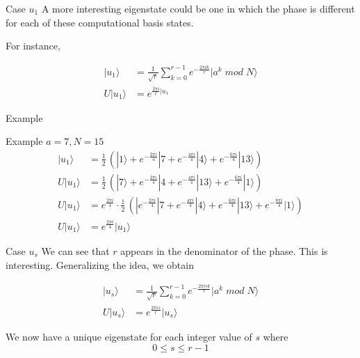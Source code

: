 \documentclass{beamer}
\begin{document}
    \begin{frame}{Case $u_1$}
        A more interesting eigenstate could be one in which the phase is different for each of these computational basis states.

        For instance,
        
        \begin{align*}
            |u_1\rangle &= \frac{1}{\sqrt{r}} \sum_{k=0}^{r-1} e^{-\frac{2 \pi i k}{r}} | a^k \; mod \; N \rangle \\
            U|u_1\rangle &= e^{\frac{2 \pi i}{r} | u_1}
        \end{align*}
    \end{frame}

    \begin{frame}{Example}
        \begin{exampleblock}{Example $a = 7, N=15$}
            \begin{align*}
                |u_1\rangle &= \frac{1}{2} \, (|1\rangle + e^{-\frac{2 \pi i}{4}}|7 + e^{-\frac{4 \pi i}{4}}|4\rangle + e^{-\frac{6 \pi i}{4}}|13\rangle) \\
                U|u_1\rangle &= \frac{1}{2} \, (|7\rangle + e^{-\frac{2 \pi i}{4}}|4 + e^{-\frac{4 \pi i}{4}}|13\rangle + e^{-\frac{6 \pi i}{4}}|1\rangle) \\
                U|u_1\rangle &= e^{\frac{2 \pi i}{4}} \cdot \frac{1}{2} \, (|e^{-\frac{2 \pi i}{4}}|7 + e^{-\frac{4 \pi i}{4}}|4\rangle + e^{-\frac{6 \pi i}{4}}|13\rangle + e^{-\frac{8 \pi i}{4}}|1\rangle) \\
                U|u_1\rangle &= e^{\frac{2 \pi i}{4}}|u_1\rangle
            \end{align*}
        \end{exampleblock}
    \end{frame}

    \begin{frame}{Case $u_s$}
        We can see that $r$ appears in the denominator of the phase. This is interesting.
        Generalizing the idea, we obtain

        \begin{align*}
            |u_s\rangle &= \frac{1}{\sqrt{r}} \sum_{k=0}^{r-1} e^{-\frac{2 \pi i s k}{r}}|a^k \; mod \; N\rangle \\
            U|u_s\rangle &= e^{\frac{2 \pi i s}{r}}|u_s\rangle
        \end{align*}

        We now have a unique eigenstate for each integer value of $s$ where
        $$0 \leq s \leq r - 1$$
    \end{frame}
\end{document}
